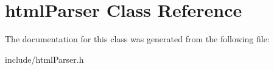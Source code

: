 \hypertarget{classhtml_parser}{\section{html\-Parser Class Reference}
\label{classhtml_parser}
}


The documentation for this class was generated from the following file\-:\begin{DoxyCompactItemize}
\item 
include/html\-Parser.\-h\end{DoxyCompactItemize}
